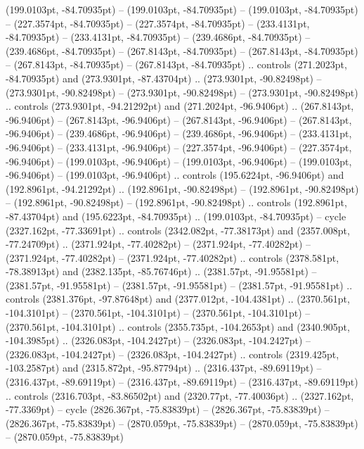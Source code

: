 (199.0103pt, -84.70935pt) -- (199.0103pt, -84.70935pt)
 -- (199.0103pt, -84.70935pt)
 -- (227.3574pt, -84.70935pt)
 -- (227.3574pt, -84.70935pt)
 -- (233.4131pt, -84.70935pt)
 -- (233.4131pt, -84.70935pt)
 -- (239.4686pt, -84.70935pt)
 -- (239.4686pt, -84.70935pt)
 -- (267.8143pt, -84.70935pt)
 -- (267.8143pt, -84.70935pt)
 -- (267.8143pt, -84.70935pt)
 -- (267.8143pt, -84.70935pt) .. controls (271.2023pt, -84.70935pt) and (273.9301pt, -87.43704pt) .. (273.9301pt, -90.82498pt)
 -- (273.9301pt, -90.82498pt)
 -- (273.9301pt, -90.82498pt)
 -- (273.9301pt, -90.82498pt) .. controls (273.9301pt, -94.21292pt) and (271.2024pt, -96.9406pt) .. (267.8143pt, -96.9406pt)
 -- (267.8143pt, -96.9406pt)
 -- (267.8143pt, -96.9406pt)
 -- (267.8143pt, -96.9406pt)
 -- (239.4686pt, -96.9406pt)
 -- (239.4686pt, -96.9406pt)
 -- (233.4131pt, -96.9406pt)
 -- (233.4131pt, -96.9406pt)
 -- (227.3574pt, -96.9406pt)
 -- (227.3574pt, -96.9406pt)
 -- (199.0103pt, -96.9406pt)
 -- (199.0103pt, -96.9406pt)
 -- (199.0103pt, -96.9406pt)
 -- (199.0103pt, -96.9406pt) .. controls (195.6224pt, -96.9406pt) and (192.8961pt, -94.21292pt) .. (192.8961pt, -90.82498pt)
 -- (192.8961pt, -90.82498pt)
 -- (192.8961pt, -90.82498pt)
 -- (192.8961pt, -90.82498pt) .. controls (192.8961pt, -87.43704pt) and (195.6223pt, -84.70935pt) .. (199.0103pt, -84.70935pt) -- cycle
(2327.162pt, -77.33691pt) .. controls (2342.082pt, -77.38173pt) and (2357.008pt, -77.24709pt) .. (2371.924pt, -77.40282pt)
 -- (2371.924pt, -77.40282pt)
 -- (2371.924pt, -77.40282pt)
 -- (2371.924pt, -77.40282pt) .. controls (2378.581pt, -78.38913pt) and (2382.135pt, -85.76746pt) .. (2381.57pt, -91.95581pt)
 -- (2381.57pt, -91.95581pt)
 -- (2381.57pt, -91.95581pt)
 -- (2381.57pt, -91.95581pt) .. controls (2381.376pt, -97.87648pt) and (2377.012pt, -104.4381pt) .. (2370.561pt, -104.3101pt)
 -- (2370.561pt, -104.3101pt)
 -- (2370.561pt, -104.3101pt)
 -- (2370.561pt, -104.3101pt) .. controls (2355.735pt, -104.2653pt) and (2340.905pt, -104.3985pt) .. (2326.083pt, -104.2427pt)
 -- (2326.083pt, -104.2427pt)
 -- (2326.083pt, -104.2427pt)
 -- (2326.083pt, -104.2427pt) .. controls (2319.425pt, -103.2587pt) and (2315.872pt, -95.87794pt) .. (2316.437pt, -89.69119pt)
 -- (2316.437pt, -89.69119pt)
 -- (2316.437pt, -89.69119pt)
 -- (2316.437pt, -89.69119pt) .. controls (2316.703pt, -83.86502pt) and (2320.77pt, -77.40036pt) .. (2327.162pt, -77.3369pt) -- cycle
(2826.367pt, -75.83839pt) -- (2826.367pt, -75.83839pt)
 -- (2826.367pt, -75.83839pt)
 -- (2870.059pt, -75.83839pt)
 -- (2870.059pt, -75.83839pt)
 -- (2870.059pt, -75.83839pt)
